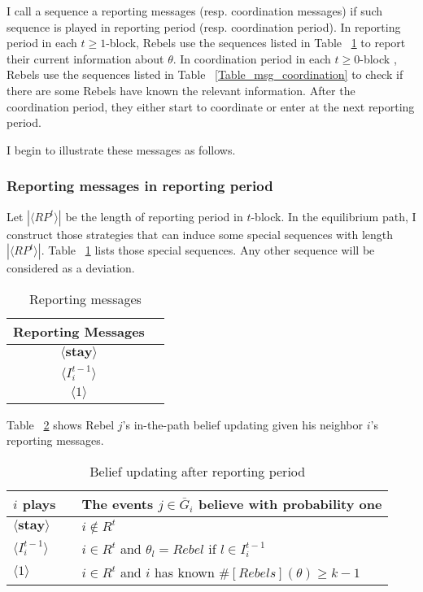 \documentclass[12pt,letterpaper]{article}
\newtheorem*{main result}{Main Result}
\theoremstyle{definition}
\theoremstyle{remark}
\theoremstyle{claim}
\begin{document}
I call a sequence a {reporting messages} ({resp.} {coordination messages}) if such sequence is played in reporting period ({resp.} coordination period). In reporting period in each $t\geq 1$-block, Rebels use the sequences listed in Table ~\ref{Table_msg_reporting} to report their current information about $\theta$. In coordination period in each $t\geq 0$-block , Rebels use the sequences listed in Table ~\ref{Table_msg_coordination} to check if there are some Rebels have known the relevant information. After the coordination period, they either start to coordinate or enter at the next reporting period. 

I begin to illustrate these messages as follows.



\subsubsection*{Reporting messages in reporting period}

Let $|\langle RP^t \rangle|$ be the length of reporting period in $t$-block.  In the equilibrium path, I construct those strategies that can induce some special sequences with length $|\langle RP^t \rangle|$. Table ~\ref{Table_msg_reporting} lists those special sequences. Any other sequence will be considered as a deviation. 

\begin{table}[ht]
\caption{Reporting messages}
\label{Table_msg_reporting}
\begin{center}
\begin{tabular}{c c }
Reporting Messages 		&   \\
\hline
$\langle  \textbf{stay} \rangle$ 	& 	 \\
$\langle  {I^{t-1}_i} \rangle$ 		&   \\
$\langle 1 \rangle$ 		             &    
\end{tabular}
\end{center}
\end{table}

Table ~\ref{Table_blf_up_reporting} shows Rebel $j$'s in-the-path belief updating given his neighbor $i$'s reporting messages.


\begin{table}[ht]
\caption{Belief updating after reporting period}
\label{Table_blf_up_reporting}
\begin{center}
\begin{tabular}{l c l}
$i$ plays 		&  			& The events $j\in \bar{G}_i$ believe with probability one  \\
\hline
$\langle  \textbf{stay} \rangle$ 	& 			    & $i\notin R^t$  \\
$\langle  {I^{t-1}_i} \rangle$ 		&  			& $i\in R^t$ and $\theta_l=Rebel$ if $l\in I^{t-1}_i$      \\
$\langle 1 \rangle$ 		             &  			& $i\in R^t$ and $i$ has known $\#[Rebels](\theta)\geq k-1$ \\
\end{tabular}
\end{center}
\end{table}
\end{document}
